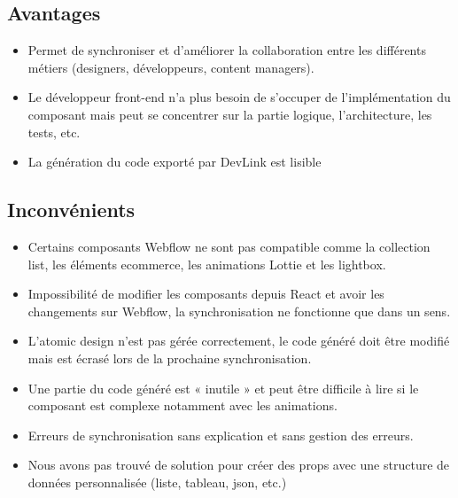 \subsection{Avantages}
\begin{itemize}
  \item Permet de synchroniser et d'améliorer la collaboration entre les différents métiers (designers, développeurs, content managers).
  \item Le développeur front-end n'a plus besoin de s'occuper de l'implémentation du composant mais peut se concentrer sur la partie logique, l'architecture, les tests, etc.
  \item La génération du code exporté par DevLink est lisible
\end{itemize}

\subsection{Inconvénients}
\begin{itemize}
  \item Certains composants Webflow ne sont pas compatible comme la collection list, les éléments ecommerce, les animations Lottie et les lightbox.
  \item Impossibilité de modifier les composants depuis React et avoir les changements sur Webflow, la synchronisation ne fonctionne que dans un sens.
  \item L'atomic design n'est pas gérée correctement, le code généré doit être modifié mais est écrasé lors de la prochaine synchronisation.
  \item Une partie du code généré est « inutile » et peut être difficile à lire si le composant est complexe notamment avec les animations.
  \item Erreurs de synchronisation sans explication et sans gestion des erreurs.
  \item Nous avons pas trouvé de solution pour créer des props avec une structure de données personnalisée (liste, tableau, json, etc.)
\end{itemize}

